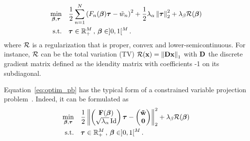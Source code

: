 \begin{equation}
  \label{eq:optim_pb}
  \begin{aligned}
    \min_{\bbeta,\btau} \quad &
    \frac{1}{2} \sum_{n=1}^{N} {\left(F_{n}(\bbeta)\btau - \tilde{w}_{n}\right)}^{2}
    +\frac{1}{2}\lambda_{\alpha}\norm{\btau}_{2}^{2} + \lambda_{\beta}\mR(\bbeta) \\
    \textrm{s.t.} \quad &
    \btau \in \RR^{M}_{+} \, , \, \bbeta \in ]0,1[^{M} \, .
  \end{aligned}
\end{equation}
where $\mathcal{R}$ is a regularization that is proper, convex and lower-semicontinuous.
For instance, $\mathcal{R}$ can be the total variation (TV) $\mathcal{R}(\mathbf{x})=\left\lVert\mathbf{D}\mathbf{x}\right\rVert_{1}$
with $\mathbf{D}$ the discrete gradient matrix defined as the idendity matrix with
coefficients -1 on its subdiagonal.

Equation~\eqref{eq:optim_pb} has the typical form of a constrained variable
projection problem~\cite{Golub_G_2003_j-inv-prob_separable_nlsvpma}.
Indeed, it can be formulated as
\begin{equation}
  \begin{aligned}
    \min_{\boldsymbol{\beta},\boldsymbol{\tau}} \quad &
    \frac{1}{2} \left\lVert\begin{pmatrix}\mathbf{F}(\boldsymbol{\beta}) \\ \sqrt{\lambda_{\alpha}}\operatorname{\mathrm{Id}}\end{pmatrix}\boldsymbol{\tau}
        - \begin{pmatrix}\boldsymbol{\tilde{\mathbf{w}}}\\ \mathbf{0} \end{pmatrix}\right\rVert_{2}^{2}
    + \lambda_{\beta}\mathcal{R}(\boldsymbol{\beta}) \\
    \textrm{s.t.} \quad &
    \boldsymbol{\tau} \in \mathbb{R}^{M}_{+} \, , \, \boldsymbol{\beta} \in ]0,1[^{M} \, .
  \end{aligned}
\end{equation}

